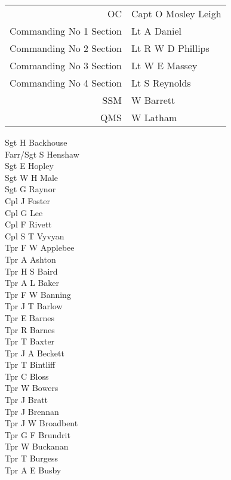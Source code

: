 \begin{center}
  \begin{tabular}{rl}
    OC & Capt O Mosley Leigh \\
    Commanding No 1 Section & Lt A Daniel \\
    Commanding No 2 Section & Lt R W D Phillips \\
    Commanding No 3 Section & Lt W E Massey \\
    Commanding No 4 Section & Lt S Reynolds \\
    SSM & W Barrett \\
    QMS & W Latham \\
  \end{tabular}
\end{center}

\begin{multicols}{2}
  \noindent
  Sgt H Backhouse \\
  Farr/Sgt S Henshaw \\
  Sgt E Hopley \\
  Sgt W H Male \\
  Sgt G Raynor \\
  Cpl J Foster \\
  Cpl G Lee \\
  Cpl F Rivett \\
  Cpl S T Vyvyan \\
  Tpr F W Applebee \\
  Tpr A Ashton \\
  Tpr H S Baird \\
  Tpr A L Baker \\
  Tpr F W Banning \\
  Tpr J T Barlow \\
  Tpr E Barnes \\
  Tpr R Barnes \\
  Tpr T Baxter \\
  Tpr J A Beckett \\
  Tpr T Bintliff \\
  Tpr C Bloss \\
  Tpr W Bowers \\
  Tpr J Bratt \\
  Tpr J Brennan \\
  Tpr J W Broadbent \\
  Tpr G F Brundrit \\
  Tpr W Buckanan \\
  Tpr T Burgess \\
  Tpr A E Busby \\

\end{multicols}
